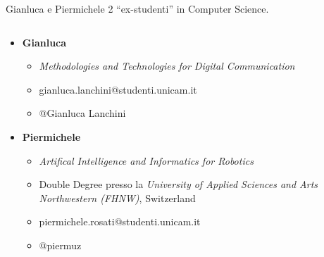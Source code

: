 \begin{frame}{Gianluca e Piermichele}
    2 ``ex-studenti'' in Computer Science.
    \begin{columns}[t]
        \begin{column}{.75\textwidth}
          \begin{itemize}
            \item \textbf{Gianluca}
            \begin{itemize}
            \item<1->[{\texttt{[image: img/books-icon.png]}}] \textit{Methodologies and Technologies for Digital Communication}
            \item<2->[{\texttt{[image: img/gmail-icon.png]}}] gianluca.lanchini@studenti.unicam.it
            \item<2->[{\texttt{[image: img/telegram-logo.png]}}] @Gianluca Lanchini
            \end{itemize}

            \vspace{0.2cm}

            \item \textbf{Piermichele}
            \begin{itemize}
              \item<1->[{\texttt{[image: img/books-icon.png]}}] \textit{Artifical Intelligence and Informatics for Robotics}
              \item<2->[{\texttt{[image: img/swiss-flag.png]}}]  Double Degree presso la \textit{University of Applied Sciences and Arts Northwestern (FHNW)}, Switzerland
              \vspace{0.2cm}
              \item<3->[{\texttt{[image: img/gmail-icon.png]}}] piermichele.rosati@studenti.unicam.it
              \item<3->[{\texttt{[image: img/telegram-logo.png]}}] @piermuz
            \end{itemize}
          \end{itemize}
        \end{column}
        \begin{column}{.4\textwidth}
        \end{column}
      \end{columns}
    \end{frame}